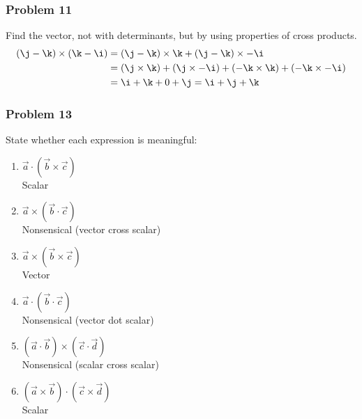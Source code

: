 \documentclass[letterpaper, 12pt]{math}
\begin{document}
\subsubsection*{Problem 11}
Find the vector, not with determinants, but by using properties of cross
products.
\begin{align*}
  (\j-\k)\times(\k-\i) &= (\j-\k)\times\k+(\j-\k)\times-\i \\
  &= (\j\times\k)+(\j\times-\i)+(-\k\times\k)+(-\k\times-\i) \\
  &= \i+\k+0+\j = \i+\j+\k
\end{align*}

\subsubsection*{Problem 13}
State whether each expression is meaningful:
\begin{enumerate}
  \item \( \vec{a}\cdot(\vec{b}\times\vec{c}) \) \\
  Scalar
  \item \( \vec{a}\times(\vec{b}\cdot\vec{c}) \) \\
  Nonsensical (vector cross scalar)
  \item \( \vec{a}\times(\vec{b}\times\vec{c}) \) \\
  Vector
  \item \( \vec{a}\cdot(\vec{b}\cdot\vec{c}) \) \\
  Nonsensical (vector dot scalar)
  \item \( (\vec{a}\cdot\vec{b})\times(\vec{c}\cdot\vec{d}) \) \\
  Nonsensical (scalar cross scalar)
  \item \( (\vec{a}\times\vec{b})\cdot(\vec{c}\times\vec{d}) \) \\
  Scalar
\end{enumerate}
\end{document}
